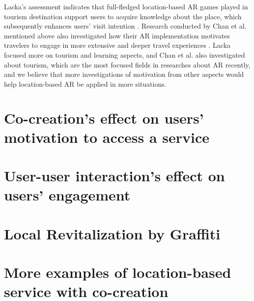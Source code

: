 Lacka's assessment indicates that full-fledged location-based AR games played in tourism destination support users to acquire knowledge about the place,
which subsequently enhances users' visit intention \cite{lacka_2018}.
Research conducted by Chan et al. mentioned above also investigated how their AR implementation motivates travelers to engage in more extensive and deeper travel experiences \cite{chan_lin_wang_lu_hsu_2017}.
Lacka focused more on tourism and learning aspects, and Chan et al. also investigated about tourism, which are the most focused fields in researches about AR recently,
and we believe that more investigations of motivation from other aspects would help location-based AR be applied in more situations.

\section{Co-creation's effect on users' motivation to access a service}

\section{User-user interaction's effect on users' engagement}

\section{Local Revitalization by Graffiti}

\section{More examples of location-based service with co-creation}
